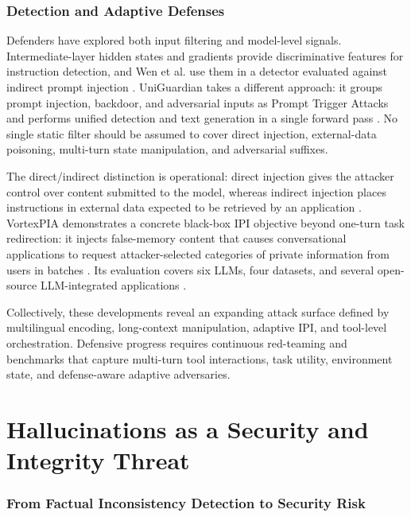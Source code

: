 \documentclass[11pt,a4paper]{article}
\begin{document}
\subsubsection{Detection and Adaptive Defenses}

Defenders have explored both input filtering and model-level signals. Intermediate-layer hidden states and gradients provide discriminative features for instruction detection, and Wen et al. use them in a detector evaluated against indirect prompt injection \cite{Wen_2025_Defending_cadb901b}. UniGuardian takes a different approach: it groups prompt injection, backdoor, and adversarial inputs as Prompt Trigger Attacks and performs unified detection and text generation in a single forward pass \cite{Lin_2025_Uniguardian_552288e3}. No single static filter should be assumed to cover direct injection, external-data poisoning, multi-turn state manipulation, and adversarial suffixes.

The direct/indirect distinction is operational: direct injection gives the attacker control over content submitted to the model, whereas indirect injection places instructions in external data expected to be retrieved by an application \cite{Greshake_2023_IndirectPI_428e23e8}. VortexPIA demonstrates a concrete black-box IPI objective beyond one-turn task redirection: it injects false-memory content that causes conversational applications to request attacker-selected categories of private information from users in batches \cite{Cui_2025_LLMs_095e8484}. Its evaluation covers six LLMs, four datasets, and several open-source LLM-integrated applications \cite{Cui_2025_LLMs_095e8484}.

Collectively, these developments reveal an expanding attack surface defined by multilingual encoding, long-context manipulation, adaptive IPI, and tool-level orchestration. Defensive progress requires continuous red-teaming and benchmarks that capture multi-turn tool interactions, task utility, environment state, and defense-aware adaptive adversaries.

\section{Hallucinations as a Security and Integrity Threat}

\subsubsection{From Factual Inconsistency Detection to Security Risk}
\end{document}
